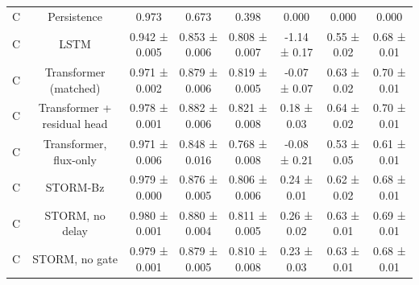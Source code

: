 \begin{tabular}{lccccccc}
C & Persistence & 0.973 & 0.673 & 0.398 & 0.000 & 0.000 & 0.000 \\
C & LSTM & 0.942 ± 0.005 & 0.853 ± 0.006 & 0.808 ± 0.007 & -1.14 ± 0.17 & 0.55 ± 0.02 & 0.68 ± 0.01 \\
C & Transformer (matched) & 0.971 ± 0.002 & 0.879 ± 0.006 & 0.819 ± 0.005 & -0.07 ± 0.07 & 0.63 ± 0.02 & 0.70 ± 0.01 \\
C & Transformer + residual head & 0.978 ± 0.001 & 0.882 ± 0.006 & 0.821 ± 0.008 & 0.18 ± 0.03 & 0.64 ± 0.02 & 0.70 ± 0.01 \\
C & Transformer, flux-only & 0.971 ± 0.006 & 0.848 ± 0.016 & 0.768 ± 0.008 & -0.08 ± 0.21 & 0.53 ± 0.05 & 0.61 ± 0.01 \\
C & STORM-Bz & 0.979 ± 0.000 & 0.876 ± 0.005 & 0.806 ± 0.006 & 0.24 ± 0.01 & 0.62 ± 0.02 & 0.68 ± 0.01 \\
C & STORM, no delay & 0.980 ± 0.001 & 0.880 ± 0.004 & 0.811 ± 0.005 & 0.26 ± 0.02 & 0.63 ± 0.01 & 0.69 ± 0.01 \\
C & STORM, no gate & 0.979 ± 0.001 & 0.879 ± 0.005 & 0.810 ± 0.008 & 0.23 ± 0.03 & 0.63 ± 0.01 & 0.68 ± 0.01 \\
\bottomrule
\end{tabular}
